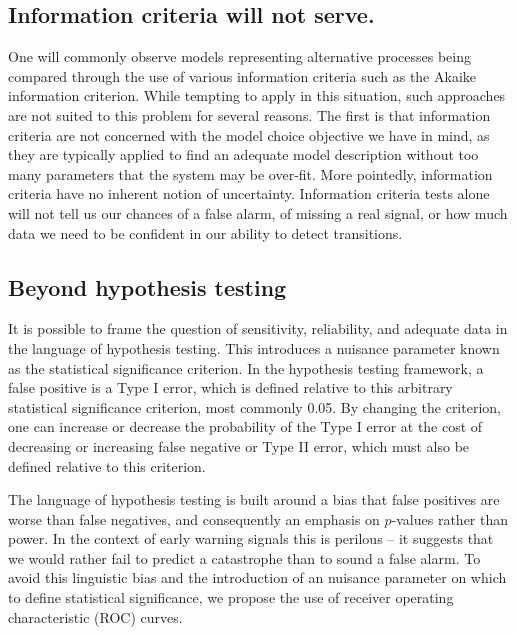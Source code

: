 \documentclass[authoryear,review,11pt]{elsarticle}
\begin{document}
%

\subsection*{Information criteria will not serve.}
One will commonly observe models representing alternative processes being compared through
the use of various information criteria such as the Akaike information criterion.
While tempting to apply in this situation, such approaches are not suited to this problem for several reasons.
The first is that information criteria are not concerned with the model choice objective we have in mind,
as they are typically applied to find an adequate model description without too many parameters that the system may be over-fit.
More pointedly, information criteria have no inherent notion of uncertainty.
Information criteria tests alone will not tell us our chances of a false alarm, of missing a real signal,
or how much data we need to be confident in our ability to detect transitions.

\subsection*{Beyond hypothesis testing}
It is possible to frame the question of sensitivity, reliability, and adequate data in the language of hypothesis testing.
This introduces a nuisance parameter known as the statistical significance criterion.
In the hypothesis testing framework, a false positive is a Type I error,
which is defined relative to this arbitrary statistical significance criterion, most commonly 0.05.
By changing the criterion, one can increase or decrease the probability of the Type I error
at the cost of decreasing or increasing false negative or Type II error, which must also be defined relative to this criterion.

The language of hypothesis testing is built around a bias that false positives are worse than false negatives,
and consequently an emphasis on $p$-values rather than power.
In the context of early warning signals this is perilous --
it suggests that we would rather fail to predict a catastrophe than to sound a false alarm.
To avoid this linguistic bias and the introduction of an nuisance parameter on which to define statistical significance,
we propose the use of receiver operating characteristic (ROC) curves.
\end{document}
